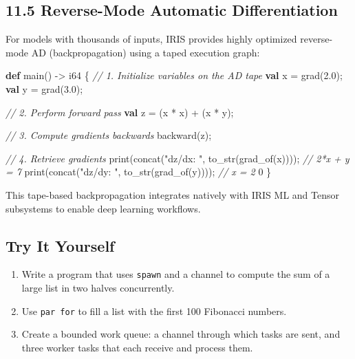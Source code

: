 \documentclass[
  english,
]{book}
\newenvironment{Shaded}{\begin{snugshade}}{\end{snugshade}}
\newcommand{\CommentTok}[1]{\textcolor[rgb]{0.42,0.60,0.33}{\textit{#1}}}
\newcommand{\DataTypeTok}[1]{\textcolor[rgb]{0.31,0.79,0.69}{#1}}
\newcommand{\DecValTok}[1]{\textcolor[rgb]{0.71,0.81,0.66}{#1}}
\newcommand{\FloatTok}[1]{\textcolor[rgb]{0.71,0.81,0.66}{#1}}
\newcommand{\FunctionTok}[1]{\textcolor[rgb]{0.86,0.86,0.67}{#1}}
\newcommand{\KeywordTok}[1]{\textcolor[rgb]{0.34,0.61,0.84}{\textbf{#1}}}
\newcommand{\NormalTok}[1]{\textcolor[rgb]{0.83,0.83,0.83}{#1}}
\newcommand{\OperatorTok}[1]{\textcolor[rgb]{0.83,0.83,0.83}{#1}}
\newcommand{\StringTok}[1]{\textcolor[rgb]{0.81,0.57,0.47}{#1}}
\providecommand{\tightlist}{%
  \setlength{\itemsep}{0pt}\setlength{\parskip}{0pt}}
\begin{document}
\subsection{11.5 Reverse-Mode Automatic
Differentiation}\label{reverse-mode-automatic-differentiation}

For models with thousands of inputs, IRIS provides highly optimized
reverse-mode AD (backpropagation) using a taped execution graph:

\begin{Shaded}
\begin{Highlighting}[]
\KeywordTok{def}\NormalTok{ main() }\OperatorTok{{-}\textgreater{}} \DataTypeTok{i64}\NormalTok{ \{}
    \CommentTok{// 1. Initialize variables on the AD tape}
    \KeywordTok{val}\NormalTok{ x }\OperatorTok{=} \DataTypeTok{grad}\NormalTok{(}\FloatTok{2.0}\NormalTok{);}
    \KeywordTok{val}\NormalTok{ y }\OperatorTok{=} \DataTypeTok{grad}\NormalTok{(}\FloatTok{3.0}\NormalTok{);}
    
    \CommentTok{// 2. Perform forward pass}
    \KeywordTok{val}\NormalTok{ z }\OperatorTok{=}\NormalTok{ (x }\OperatorTok{*}\NormalTok{ x) }\OperatorTok{+}\NormalTok{ (x }\OperatorTok{*}\NormalTok{ y);}
    
    \CommentTok{// 3. Compute gradients backwards}
\NormalTok{    backward(z);}
    
    \CommentTok{// 4. Retrieve gradients}
    \FunctionTok{print}\NormalTok{(}\FunctionTok{concat}\NormalTok{(}\StringTok{"dz/dx: "}\NormalTok{, }\FunctionTok{to\_str}\NormalTok{(grad\_of(x)))); }\CommentTok{// 2*x + y = 7}
    \FunctionTok{print}\NormalTok{(}\FunctionTok{concat}\NormalTok{(}\StringTok{"dz/dy: "}\NormalTok{, }\FunctionTok{to\_str}\NormalTok{(grad\_of(y)))); }\CommentTok{// x = 2}
    \DecValTok{0}
\NormalTok{\}}
\end{Highlighting}
\end{Shaded}

This tape-based backpropagation integrates natively with IRIS ML and
Tensor subsystems to enable deep learning workflows.

\subsection{Try It Yourself}\label{try-it-yourself-10}

\begin{enumerate}
\def\labelenumi{\arabic{enumi}.}
\tightlist
\item
  Write a program that uses \texttt{spawn} and a channel to compute the
  sum of a large list in two halves concurrently.
\item
  Use \texttt{par\ for} to fill a list with the first 100 Fibonacci
  numbers.
\item
  Create a bounded work queue: a channel through which tasks are sent,
  and three worker tasks that each receive and process them.
\end{enumerate}
\end{document}
